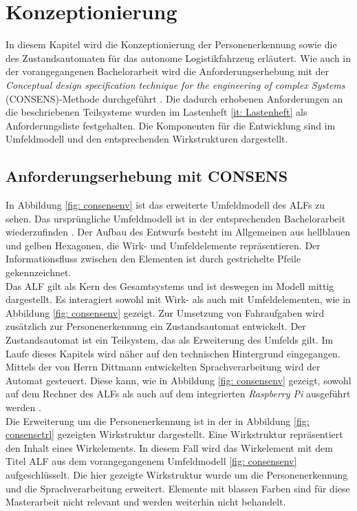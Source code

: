 \chapter{Konzeptionierung}
\label{ch: Konzeptionierung}

In diesem Kapitel wird die Konzeptionierung der Personenerkennung sowie die des Zustandsautomaten für das autonome Logistikfahrzeug erläutert. Wie auch in der vorangegangenen Bachelorarbeit wird die Anforderungserhebung mit der \textit{Conceptual design specification technique for the engineering of complex Systems} (CONSENS)-Methode durchgeführt \cite{Bachelorarbeit}. Die dadurch erhobenen Anforderungen an die beschriebenen Teilsysteme wurden im Lastenheft \ref{it: Lastenheft} als Anforderungsliste festgehalten. Die Komponenten für die Entwicklung sind im Umfeldmodell und den entsprechenden Wirkstrukturen dargestellt.
	
	
	\section{Anforderungserhebung mit CONSENS}
	\label{sec: Anforderungserhebung}
	
	In Abbildung \ref{fig: consensenv} ist das erweiterte Umfeldmodell des ALFs zu sehen. Das ursprüngliche Umfeldmodell ist in der entsprechenden Bachelorarbeit wiederzufinden \cite{Bachelorarbeit}. Der Aufbau des Entwurfs besteht im Allgemeinen aus hellblauen und gelben Hexagonen, die Wirk- und Umfeldelemente repräsentieren. Der Informationsfluss zwischen den Elementen ist durch gestrichelte Pfeile gekennzeichnet.\\
	
	Das ALF gilt als Kern des Gesamtsystems und ist deswegen im Modell mittig dargestellt. Es interagiert sowohl mit Wirk- als auch mit Umfeldelementen, wie in Abbildung \ref{fig: consensenv} gezeigt. Zur Umsetzung von Fahraufgaben wird zusätzlich zur Personenerkennung ein Zustandsautomat entwickelt. Der Zustandsautomat ist ein Teilsystem, das als Erweiterung des Umfelds gilt. Im Laufe dieses Kapitels wird näher auf den technischen Hintergrund eingegangen. Mittels der von Herrn Dittmann entwickelten Sprachverarbeitung wird der Automat gesteuert. Diese kann, wie in Abbildung \ref{fig: consensenv} gezeigt, sowohl auf dem Rechner des ALFs als auch auf dem integrierten \textit{Raspberry Pi} ausgeführt werden \cite{Dittmann}. \\
	
		
	
	Die Erweiterung um die Personenerkennung ist in der in Abbildung \ref{fig: consensctrl} gezeigten Wirkstruktur dargestellt. Eine Wirkstruktur repräsentiert den Inhalt eines Wirkelements. In diesem Fall wird das Wirkelement mit dem Titel ALF aus dem vorangegangenem Umfeldmodell \ref{fig: consensenv} aufgeschlüsselt. Die hier gezeigte Wirkstruktur wurde um die Personenerkennung und die Sprachverarbeitung erweitert. Elemente mit blassen Farben sind für diese Masterarbeit nicht relevant und werden weiterhin nicht behandelt.\\
	

